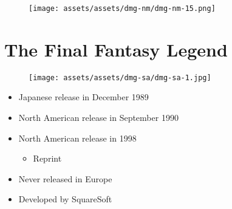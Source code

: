 \documentclass{book}
\begin{document}
\begin{figure}[hbt]
\vskip 10pt
\centering \texttt{[image: assets/assets/dmg-nm/dmg-nm-15.png]}
\vskip 6pt
\end{figure}



\begingroup \chapter*{The Final Fantasy Legend} \endgroup
\begin{figure}[H]
\vskip 4pt
\centering
\texttt{[image: assets/assets/dmg-sa/dmg-sa-1.jpg]}\end{figure}
\begin{itemize} [nosep]




\item Japanese release in December 1989







\item North American release in September 1990







\item North American release in 1998
\begin{itemize} [nosep]\item Reprint\end{itemize}\noindent









\item Never released in Europe



\item Developed by SquareSoft

\end{itemize}\noindent
\end{document}
